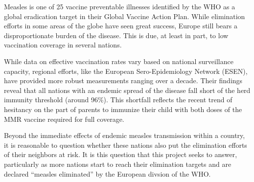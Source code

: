 \documentclass[../Paper.tex]{subfiles}
\begin{document}
\raggedright
Measles is one of 25 vaccine preventable illnesses identified by the WHO as a
global eradication target in their Global Vaccine Action Plan. While elimination
efforts in some areas of the globe have seen great success, Europe still bears a
disproportionate burden of the disease. This is due, at least in part, to low
vaccination coverage in several nations.

While data on effective vaccination rates vary based on national surveillance
capacity, regional efforts, like the European Sero-Epidemiology Network (ESEN),
have provided more robust measurements ranging over a decade. Their findings
reveal that all nations with an endemic spread of the disease fall short of the
herd immunity threshold (around 96\%). This shortfall reflects the recent trend
of hesitancy on the part of parents to immunize their child with both doses of
the MMR vaccine required for full coverage.

Beyond the immediate effects of endemic measles transmission within a country,
it is reasonable to question whether these nations also put the elimination efforts
of their neighbors at risk. It is this question that this project seeks to answer,
particularly as more nations start to reach their elimination targets and are declared
``measles eliminated'' by the European divsion of the WHO.

\clearpage
\end{document}
